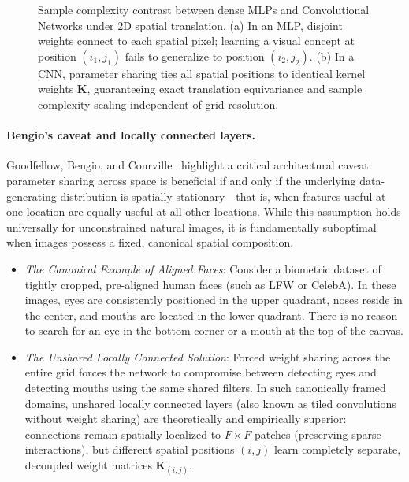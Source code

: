 \begin{figure}[H]
\caption{Sample complexity contrast between dense MLPs and Convolutional Networks under 2D spatial translation. (a) In an MLP, disjoint weights connect to each spatial pixel; learning a visual concept at position $(i_1, j_1)$ fails to generalize to position $(i_2, j_2)$. (b) In a CNN, parameter sharing ties all spatial positions to identical kernel weights $\mathbf{K}$, guaranteeing exact translation equivariance and sample complexity scaling independent of grid resolution.}
\label{fig:mlp_vs_cnn_sample_complexity}
\end{figure}

\paragraph{Bengio's caveat and locally connected layers.}
Goodfellow, Bengio, and Courville~\cite{goodfellow2016deep} highlight a critical architectural caveat: parameter sharing across space is beneficial if and only if the underlying data-generating distribution is spatially stationary---that is, when features useful at one location are equally useful at all other locations. While this assumption holds universally for unconstrained natural images, it is fundamentally suboptimal when images possess a fixed, canonical spatial composition.
\begin{itemize}[leftmargin=*]
  \item \textit{The Canonical Example of Aligned Faces}:
    Consider a biometric dataset of tightly cropped, pre-aligned human faces (such as LFW or CelebA). In these images, eyes are consistently positioned in the upper quadrant, noses reside in the center, and mouths are located in the lower quadrant. There is no reason to search for an eye in the bottom corner or a mouth at the top of the canvas.
  \item \textit{The Unshared Locally Connected Solution}:
    Forced weight sharing across the entire grid forces the network to compromise between detecting eyes and detecting mouths using the same shared filters. In such canonically framed domains, unshared locally connected layers (also known as tiled convolutions without weight sharing) are theoretically and empirically superior: connections remain spatially localized to $F \times F$ patches (preserving sparse interactions), but different spatial positions $(i, j)$ learn completely separate, decoupled weight matrices $\mathbf{K}_{(i, j)}$.
\end{itemize}

